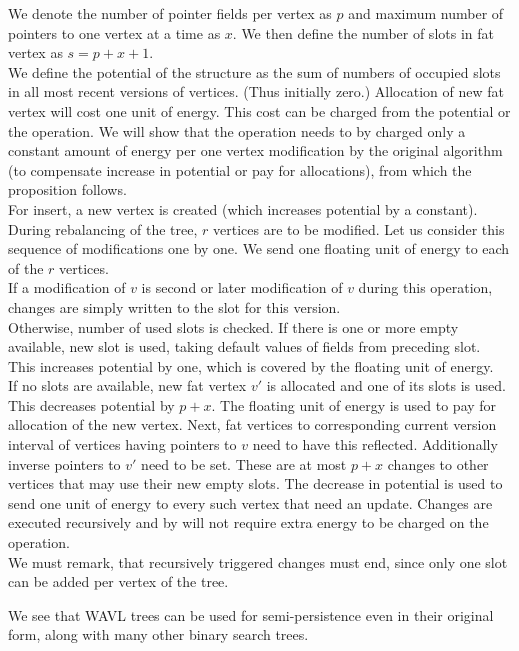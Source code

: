 \begin{myproof}
We denote the number of pointer fields per vertex as $p$ and maximum number of pointers to one vertex at a time as $x$. We then define the number of slots in fat vertex as $s = p + x + 1$.\\
We define the potential of the structure as the sum of numbers of occupied slots in all most recent versions of vertices. (Thus initially zero.) Allocation of new fat vertex will cost one unit of energy. This cost can be charged from the potential or the operation. We will show that the operation needs to by charged only a constant amount of energy per one vertex modification by the original algorithm (to compensate increase in potential or pay for allocations), from which the proposition follows.\\
For insert, a new vertex is created (which increases potential by a constant). During rebalancing of the tree, $r$ vertices are to be modified. Let us consider this sequence of modifications one by one. We send one floating unit of energy to each of the $r$ vertices.\\
If a modification of $v$ is second or later modification of $v$ during this operation, changes are simply written to the slot for this version.\\
Otherwise, number of used slots is checked. If there is one or more empty available, new slot is used, taking default values of fields from preceding slot. This increases potential by one, which is covered by the floating unit of energy.\\
If no slots are available, new fat vertex $v'$ is allocated and one of its slots is used. This decreases potential by $p+x$. The floating unit of energy is used to pay for allocation of the new vertex. Next, fat vertices to corresponding current version interval of vertices having pointers to $v$ need to have this reflected. Additionally inverse pointers to $v'$ need to be set. These are at most $p+x$ changes to other vertices that may use their new empty slots. The decrease in potential is used to send one unit of energy to every such vertex that need an update. Changes are executed recursively and by will not require extra energy to be charged on the operation.\\
We must remark, that recursively triggered changes must end, since only one slot can be added per vertex of the tree.
\end{myproof}

We see that WAVL trees can be used for semi-persistence even in their original form, along with many other binary search trees.

